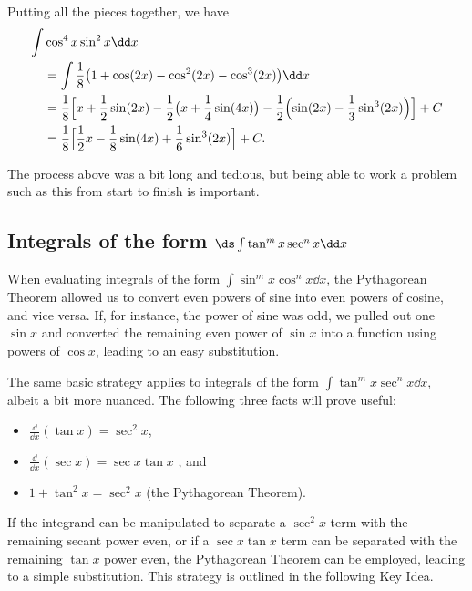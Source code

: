 \begin{example}
Putting all the pieces together, we have
\begin{align*}
	\int &\cos^4x\sin^2x\dd x \\
	&=\int \frac18\bigl(1+\cos(2x)-\cos^2(2x)-\cos^3(2x)\bigr)\dd x \\
	&= \frac18
	\Bigl[x+\frac12\sin(2x)-\frac12\bigl(x+\frac14\sin(4x)\bigr)
	-\frac12\Bigl(\sin(2x)-\frac13\sin^3(2x)\Bigr)\Bigr]
	+C \\
	&=\frac18\Bigl[\frac12x-\frac18\sin(4x)+\frac16\sin^3(2x)\Bigr]+C.
\end{align*}
\end{example}

The process above was a bit long and tedious, but being able to work a problem such as this from start to finish is important.

\subsection{Integrals of the form \texorpdfstring{$\ds\int\tan^mx\sec^nx\dd x$}{∫(tan x)\^{}m (sec x)\^{}n dx}}

When evaluating integrals of the form $\int \sin^mx\cos^nx\dd x$, the Pythagorean Theorem allowed us to convert even powers of sine into even powers of cosine, and vice versa. If, for instance, the power of sine was odd, we pulled out one $\sin x$ and converted the remaining even power of $\sin x$ into a function using powers of $\cos x$, leading to an easy substitution.

The same basic strategy applies to integrals of the form $\int \tan^mx\sec^n x\dd x$, albeit a bit more nuanced. The following three facts will prove useful:
\begin{itemize}
\item $\frac{\dd}{\dd x}(\tan x) = \sec^2x$, 
\item $\frac{\dd}{\dd x}(\sec x) = \sec x\tan x$ , and 
\item	$1+\tan^2x = \sec^2x$ (the Pythagorean Theorem).
\end{itemize}

If the integrand can be manipulated to separate a $\sec^2x$ term with the remaining secant power even, or if a $\sec x\tan x$ term can be separated with the remaining $\tan x$ power even, the Pythagorean Theorem can be employed, leading to a simple substitution. This strategy is outlined in the following Key Idea.

